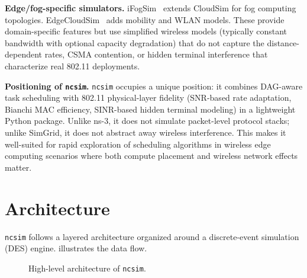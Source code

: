 \documentclass[conference]{IEEEtran}
\newcommand{\ncsim}{\texttt{ncsim}}
\begin{document}
\textbf{Edge/fog-specific simulators.}
iFogSim~\cite{ifogsim} extends CloudSim for fog computing topologies.
EdgeCloudSim~\cite{edgecloudsim} adds mobility and WLAN models.  These
provide domain-specific features but use simplified wireless models
(typically constant bandwidth with optional capacity degradation) that do not
capture the distance-dependent rates, CSMA contention, or hidden terminal
interference that characterize real 802.11 deployments.

\textbf{Positioning of \ncsim{}.}
\ncsim{} occupies a unique position: it combines DAG-aware task scheduling
with 802.11 physical-layer fidelity (SNR-based rate adaptation, Bianchi MAC
efficiency, SINR-based hidden terminal modeling) in a lightweight Python
package.  Unlike ns-3, it does not simulate packet-level protocol stacks;
unlike SimGrid, it does not abstract away wireless interference.  This makes
it well-suited for rapid exploration of scheduling algorithms in wireless
edge computing scenarios where both compute placement and wireless network
effects matter.

\section{Architecture}
\label{sec:arch}

\ncsim{} follows a layered architecture organized around a discrete-event
simulation (DES) engine.   illustrates the data flow.

\begin{figure}[t]
\centering
{}
\caption{High-level architecture of \ncsim{}.}
\label{fig:architecture}
\end{figure}
\end{document}
